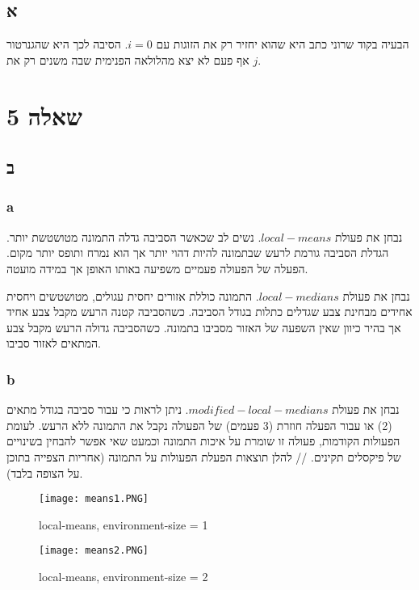 \documentclass{article}
\begin{document}
\subsection*{א}

הבעיה בקוד שרוני כתב היא שהוא יחזיר רק את הזוגות עם $i = 0$.
הסיבה לכך היא שהגנרטור אף פעם לא יצא מהלולאה הפנימית שבה משנים רק את $j$.

\section*{שאלה 5}

\subsection*{ב}

\subsubsection*{a}

נבחן את פעולת $local-means$.
נשים לב שכאשר הסביבה גדלה התמונה מטושטשת יותר. הגדלת הסביבה גורמת לרעש שבתמונה להיות דהוי יותר אך הוא נמרח ותופס יותר מקום. הפעלה של הפעולה פעמיים משפיעה באותו האופן אך במידה מועטה.

נבחן את פעולת $local-medians$.
התמונה כוללת אזורים יחסית עגולים, מטושטשים ויחסית אחידים מבחינת צבע שגדלים כתלות בגודל הסביבה. כשהסביבה קטנה הרעש מקבל צבע אחיד אך בהיר כיוון שאין השפעה של האזור מסביבו בתמונה. כשהסביבה גדולה הרעש מקבל צבע המתאים לאזור סביבו.

\subsubsection*{b}

נבחן את פעולת $modified-local-medians$.
ניתן לראות כי עבור סביבה בגודל מתאים (2) או עבור הפעלה חוזרת (3 פעמים) של הפעולה נקבל את התמונה ללא הרעש. לעומת הפעולות הקודמות, פעולה זו שומרת על איכות התמונה וכמעט שאי אפשר להבחין בשינויים של פיקסלים תקינים.
//
להלן תוצאות הפעלת הפעולות על התמונה (אחריות הצפייה בתוכן על הצופה בלבד).

\begin{figure}
  \centering
  \texttt{[image: means1.PNG]}
  \caption{local-means, environment-size = 1}
\end{figure}

\begin{figure}
  \centering
  \texttt{[image: means2.PNG]}
  \caption{local-means, environment-size = 2}
\end{figure}
\end{document}

